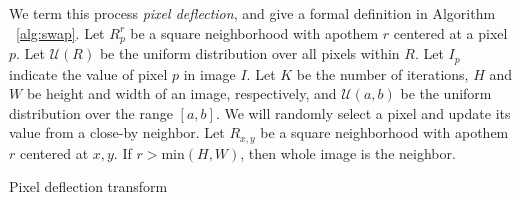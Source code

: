
We term this process \textit{pixel deflection}, and give a formal definition in Algorithm ~\ref{alg:swap}.
Let $R^r_{p}$ be a square neighborhood with apothem $r$ centered at a pixel $p$.
Let $\mathcal{U}(R)$ be the uniform distribution over all pixels within $R$.
Let $I_p$ indicate the value of pixel $p$ in image $I$.
Let $K$ be the number of iterations, $H$ and $W$ be height and width of an image, respectively, and $\mathcal{U}(a,b)$ be the uniform distribution over the range $[a,b]$. 
We will randomly select a pixel and update its value from a close-by neighbor.
Let $R_{x,y}$ be a square neighborhood with apothem $r$ centered at $x,y$.
If $r>\text{min}(H,W)$, then whole image is the neighbor. %


\begin{algorithm}
    \caption[Pixel Deflection Transform]{Pixel deflection transform}
    \label{alg:swap}
\end{algorithm}


